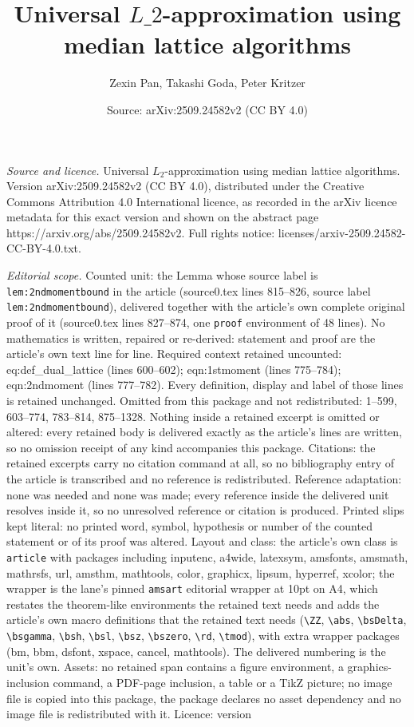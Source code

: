 \documentclass[10pt,a4paper]{amsart}
\title[Universal $L\_2$-approximation using median lattice algorithm]{Universal $L\_2$-approximation using median lattice algorithms}
\author{Zexin Pan, Takashi Goda, Peter Kritzer}
\date{Source: arXiv:2509.24582v2 (CC BY 4.0)}
\begin{document}
\maketitle

\noindent\emph{Source and licence.} Universal $L_2$-approximation using median lattice algorithms. Version arXiv:2509.24582v2 (CC BY 4.0), distributed under the Creative Commons Attribution 4.0 International licence, as recorded in the arXiv licence metadata for this exact version and shown on the abstract page https://arxiv.org/abs/2509.24582v2. Full rights notice: licenses/arxiv-2509.24582-CC-BY-4.0.txt.\par\smallskip

\noindent\textit{Editorial scope.} Counted unit: the Lemma whose source label is \texttt{lem:2ndmomentbound} in the article (source0.tex lines 815--826, source label \texttt{lem:2ndmomentbound}), delivered together with the article's own complete original proof of it (source0.tex lines 827--874, one \texttt{proof} environment of 48 lines). No mathematics is written, repaired or re-derived: statement and proof are the article's own text line for line. Required context retained uncounted: eq:def\_dual\_lattice (lines 600--602); eqn:1stmoment (lines 775--784); eqn:2ndmoment (lines 777--782). Every definition, display and label of those lines is retained unchanged. Omitted from this package and not redistributed: 1--599, 603--774, 783--814, 875--1328. Nothing inside a retained excerpt is omitted or altered: every retained body is delivered exactly as the article's lines are written, so no omission receipt of any kind accompanies this package. Citations: the retained excerpts carry no citation command at all, so no bibliography entry of the article is transcribed and no reference is redistributed. Reference adaptation: none was needed and none was made; every reference inside the delivered unit resolves inside it, so no unresolved reference or citation is produced. Printed slips kept literal: no printed word, symbol, hypothesis or number of the counted statement or of its proof was altered. Layout and class: the article's own class is \texttt{article} with packages including inputenc, a4wide, latexsym, amsfonts, amsmath, mathrsfs, url, amsthm, mathtools, color, graphicx, lipsum, hyperref, xcolor; the wrapper is the lane's pinned \texttt{amsart} editorial wrapper at 10pt on A4, which restates the theorem-like environments the retained text needs and adds the article's own macro definitions that the retained text needs (\texttt{\textbackslash ZZ}, \texttt{\textbackslash abs}, \texttt{\textbackslash bsDelta}, \texttt{\textbackslash bsgamma}, \texttt{\textbackslash bsh}, \texttt{\textbackslash bsl}, \texttt{\textbackslash bsz}, \texttt{\textbackslash bszero}, \texttt{\textbackslash rd}, \texttt{\textbackslash tmod}), with extra wrapper packages (bm, bbm, dsfont, xspace, cancel, mathtools). The delivered numbering is the unit's own. Assets: no retained span contains a figure environment, a graphics-inclusion command, a PDF-page inclusion, a table or a TikZ picture; no image file is copied into this package, the package declares no asset dependency and no image file is redistributed with it. Licence: version 
\end{document}
